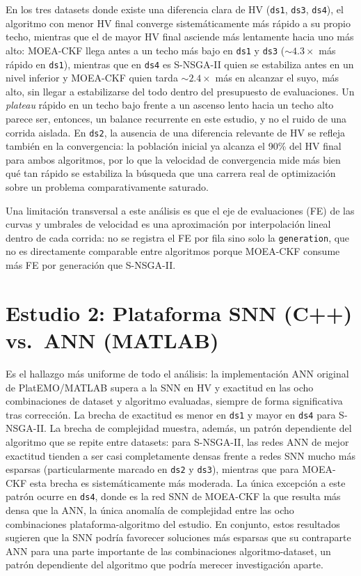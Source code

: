 En los tres datasets donde existe una diferencia clara de HV (\texttt{ds1}, \texttt{ds3}, \texttt{ds4}), el algoritmo con menor HV final converge sistemáticamente más rápido a su propio techo, mientras que el de mayor HV final asciende más lentamente hacia uno más alto: MOEA-CKF llega antes a un techo más bajo en \texttt{ds1} y \texttt{ds3} ($\sim4.3\times$ más rápido en \texttt{ds1}), mientras que en \texttt{ds4} es S-NSGA-II quien se estabiliza antes en un nivel inferior y MOEA-CKF quien tarda $\sim2.4\times$ más en alcanzar el suyo, más alto, sin llegar a estabilizarse del todo dentro del presupuesto de evaluaciones. Un \textit{plateau} rápido en un techo bajo frente a un ascenso lento hacia un techo alto parece ser, entonces, un balance recurrente en este estudio, y no el ruido de una corrida aislada. En \texttt{ds2}, la ausencia de una diferencia relevante de HV se refleja también en la convergencia: la población inicial ya alcanza el 90\% del HV final para ambos algoritmos, por lo que la velocidad de convergencia mide más bien qué tan rápido se estabiliza la búsqueda que una carrera real de optimización sobre un problema comparativamente saturado.

Una limitación transversal a este análisis es que el eje de evaluaciones (FE) de las curvas y umbrales de velocidad es una aproximación por interpolación lineal dentro de cada corrida: no se registra el FE por fila sino solo la \texttt{generation}, que no es directamente comparable entre algoritmos porque MOEA-CKF consume más FE por generación que S-NSGA-II.

\section{Estudio 2: Plataforma SNN (C++) vs.\ ANN (MATLAB)}
\label{sec:discusion-estudio2}

Es el hallazgo más uniforme de todo el análisis: la implementación ANN original de PlatEMO/MATLAB supera a la SNN en HV y exactitud en las ocho combinaciones de dataset y algoritmo evaluadas, siempre de forma significativa tras corrección. La brecha de exactitud es menor en \texttt{ds1} y mayor en \texttt{ds4} para S-NSGA-II. La brecha de complejidad muestra, además, un patrón dependiente del algoritmo que se repite entre datasets: para S-NSGA-II, las redes ANN de mejor exactitud tienden a ser casi completamente densas frente a redes SNN mucho más esparsas (particularmente marcado en \texttt{ds2} y \texttt{ds3}), mientras que para MOEA-CKF esta brecha es sistemáticamente más moderada. La única excepción a este patrón ocurre en \texttt{ds4}, donde es la red SNN de MOEA-CKF la que resulta más densa que la ANN, la única anomalía de complejidad entre las ocho combinaciones plataforma-algoritmo del estudio. En conjunto, estos resultados sugieren que la SNN podría favorecer soluciones más esparsas que su contraparte ANN para una parte importante de las combinaciones algoritmo-dataset, un patrón dependiente del algoritmo que podría merecer investigación aparte.

